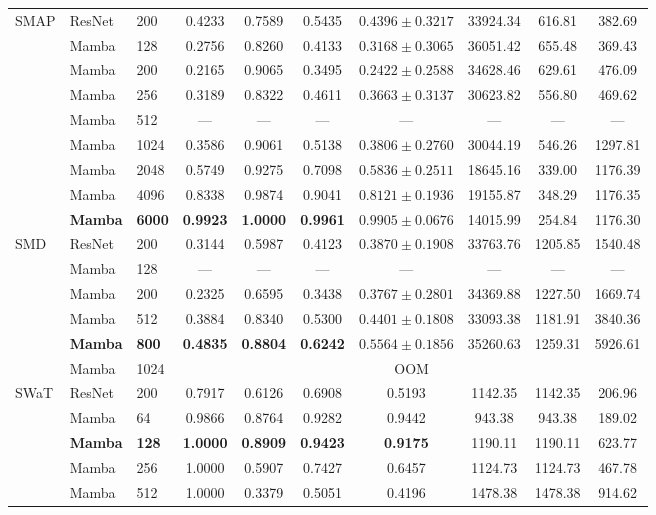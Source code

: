 \documentclass[runningheads]{llncs}
\begin{document}
\begin{table}[H]
{\begin{tabular}{lllccccccc}
\multirow{8}{*}{SMAP}
 & ResNet & 200   & 0.4233 & 0.7589 & 0.5435 & $0.4396\pm0.3217$ & 33924.34 & 616.81 & 382.69 \\
 & Mamba  & 128   & 0.2756 & 0.8260 & 0.4133 & $0.3168\pm0.3065$ & 36051.42 & 655.48 & 369.43 \\
 & Mamba  & 200   & 0.2165 & 0.9065 & 0.3495 & $0.2422\pm0.2588$ & 34628.46 &  629.61 & 476.09 \\
 & Mamba  & 256   & 0.3189 & 0.8322 & 0.4611 & $0.3663\pm0.3137$ & 30623.82 & 556.80 & 469.62 \\
 & Mamba  & 512   & \textsf{---} & \textsf{---} & \textsf{---} & \textsf{---} & \textsf{---} & \textsf{---} & \textsf{---} \\
 & Mamba  & 1024  & 0.3586 & 0.9061 & 0.5138 & $0.3806\pm0.2760$ & 30044.19 & 546.26 & 1297.81 \\
 & Mamba  & 2048  & 0.5749 & 0.9275 & 0.7098 & $0.5836\pm0.2511$ & 18645.16 & 339.00 & 1176.39 \\
 & Mamba  & 4096  & 0.8338 & 0.9874 & 0.9041 & $0.8121\pm0.1936$ & 19155.87 & 348.29 & 1176.35 \\
 & \textbf{Mamba}  & \textbf{6000}  & \textbf{0.9923} & \textbf{1.0000} & \textbf{0.9961} & $\mathbf{0.9905\pm0.0676}$ & 14015.99 & 254.84 & 1176.30 \\
\midrule

\multirow{6}{*}{SMD}
 & ResNet & 200   & 0.3144 & 0.5987 & 0.4123 & $0.3870\pm0.1908$ & 33763.76 & 1205.85 & 1540.48 \\
 & Mamba  & 128   & \textsf{---} & \textsf{---} & \textsf{---} & \textsf{---} & \textsf{---} & \textsf{---} & \textsf{---} \\
 & Mamba  & 200 & 0.2325 & 0.6595 & 0.3438 & $0.3767\pm0.2801$ & 34369.88 & 1227.50 & 1669.74 \\
 & Mamba  & 512 & 0.3884 & 0.8340 & 0.5300 & $0.4401\pm0.1808$ & 33093.38 & 1181.91 & 3840.36 \\
 & \textbf{Mamba}  & \textbf{800}   & \textbf{0.4835} & \textbf{0.8804} & \textbf{0.6242} & $\mathbf{0.5564\pm0.1856}$ & 35260.63 & 1259.31 & 5926.61 \\
 & Mamba  & 1024  & \multicolumn{7}{c}{\textsf{OOM}} \\
\midrule

\multirow{5}{*}{SWaT}
 & ResNet & 200   & 0.7917 & 0.6126 & 0.6908 & 0.5193 & 1142.35 & 1142.35 & 206.96 \\
 & Mamba  & 64    & 0.9866 & 0.8764 & 0.9282 & 0.9442 &  943.38 &  943.38 & 189.02 \\
 & \textbf{Mamba}  & \textbf{128}   & \textbf{1.0000} & \textbf{0.8909} & \textbf{0.9423} & \textbf{0.9175} & 1190.11 & 1190.11 & 623.77 \\
 & Mamba  & 256   & 1.0000 & 0.5907 & 0.7427 & 0.6457 & 1124.73 & 1124.73 & 467.78 \\
 & Mamba  & 512   & 1.0000 & 0.3379 & 0.5051 & 0.4196 & 1478.38 & 1478.38 & 914.62 \\
\midrule


\end{tabular}}
\end{table}
\end{document}
